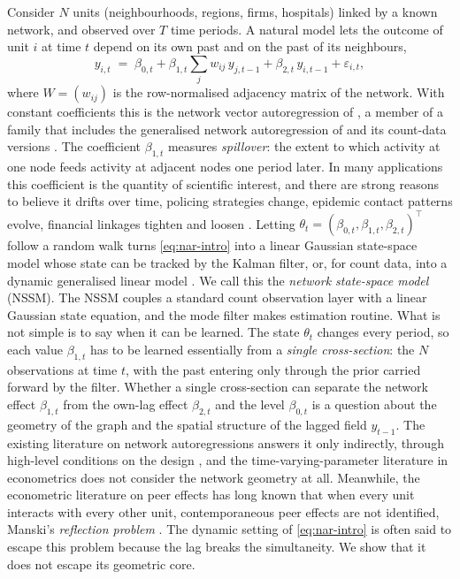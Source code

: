 \documentclass[12pt]{article}
\theoremstyle{plain}
\theoremstyle{definition}
\theoremstyle{remark}
\newcommand{\T}{^{\top}}
\begin{document}
Consider $N$ units (neighbourhoods, regions, firms, hospitals) linked by a known network, and observed over $T$ time periods. A natural model lets the outcome of unit $i$ at time $t$ depend on its own past and on the past of its neighbours,
\begin{equation}\label{eq:nar-intro}
y_{i,t} \;=\; \beta_{0,t} + \beta_{1,t}\sum_{j} w_{ij}\,y_{j,t-1} + \beta_{2,t}\,y_{i,t-1} + \varepsilon_{i,t},
\end{equation}
where $W=(w_{ij})$ is the row-normalised adjacency matrix of the network. With constant coefficients this is the network vector autoregression of \citet{zhu2017network}, a member of a family that includes the generalised network autoregression of \citet{knight2020gnar} and its count-data versions \citep{armillotta2023nonlinear,armillotta2024count}. The coefficient $\beta_{1,t}$ measures \emph{spillover}: the extent to which activity at one node feeds activity at adjacent nodes one period later. In many applications this coefficient is the quantity of scientific interest, and there are strong reasons to believe it drifts over time, policing strategies change, epidemic contact patterns evolve, financial linkages tighten and loosen \citep{diebold2014network}. Letting $\theta_t=(\beta_{0,t},\beta_{1,t},\beta_{2,t})\T$ follow a random walk turns \eqref{eq:nar-intro} into a linear Gaussian state-space model whose state can be tracked by the Kalman filter, or, for count data, into a dynamic generalised linear model \citep{west1985dynamic,fahrmeir1992posterior}. We call this the \emph{network state-space model} (NSSM). The NSSM couples a standard count observation layer with a linear Gaussian state equation, and the mode filter makes estimation routine. What is not simple is to say when it can be learned. The state $\theta_t$ changes every period, so each value $\beta_{1,t}$ has to be learned essentially from a \emph{single cross-section}: the $N$ observations at time $t$, with the past entering only through the prior carried forward by the filter. Whether a single cross-section can separate the network effect $\beta_{1,t}$ from the own-lag effect $\beta_{2,t}$ and the level $\beta_{0,t}$ is a question about the geometry of the graph and the spatial structure of the lagged field $y_{t-1}$. The existing literature on network autoregressions answers it only indirectly, through high-level conditions on the design \citep[e.g.][Assumption C]{zhu2017network}, and the time-varying-parameter literature in econometrics \citep{primiceri2005time,koop2013large} does not consider the network geometry at all. Meanwhile, the econometric literature on peer effects has long known that when every unit interacts with every other unit, contemporaneous peer effects are not identified, Manski's \emph{reflection problem} \citep{manski1993identification,lee2007identification,bramoulle2009identification}. The dynamic setting of \eqref{eq:nar-intro} is often said to escape this problem because the lag breaks the simultaneity. We show that it does not escape its geometric core.
\end{document}
